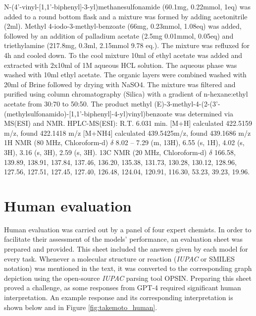 \documentclass[10pt]{article}
\begin{document}
N-(4'-vinyl-[1,1'-biphenyl]-3-yl)methanesulfonamide (60.1mg, 0.22mmol, 1eq) was added to a round bottom flask and a mixture was formed by adding acetonitrile (2ml). Methyl 4-iodo-3-methyl-benzoate (66mg, 0.23mmol, 1.08eq) was added, followed by an addition of palladium acetate (2.5mg 0.01mmol, 0.05eq) and triethylamine (217.8mg, 0.3ml, 2.15mmol 9.78 eq.). The mixture was refluxed for 4h and cooled down.  To the cool mixture 10ml of ethyl acetate was added and extracted with 2x10ml of 1M aqueous HCL solution. The aqueous phase was washed with 10ml ethyl acetate. The organic layers were combined washed with 20ml of Brine followed by drying with NaSO4. The mixture was filtered and purified using column chromatography (Silica) with a gradient of n-hexane:ethyl acetate  from 30:70 to 50:50. The product methyl (E)-3-methyl-4-(2-(3'-(methylsulfonamido)-[1,1'-biphenyl]-4-yl)vinyl)benzoate was determined via MS(ESI) and NMR.
HPLC-MS(ESI): R.T. 6.031 min. [M+H] calculated 422.5159 m/z, found 422.1418 m/z
[M+NH4] calculated 439.5425m/z, found 439.1686 m/z
1H NMR (80 MHz, Chloroform-d) $\delta$ 8.02 – 7.29 (m, 13H), 6.55 (s, 1H), 4.02 (s, 3H), 3.16 (s, 3H), 2.59 (s, 3H).
13C NMR (20 MHz, Chloroform-d) $\delta$ 166.58, 139.89, 138.91, 137.84, 137.46, 136.20, 135.38, 131.73, 130.28, 130.12, 128.96, 127.56, 127.51, 127.45, 127.40, 126.48, 124.04, 120.91, 116.30, 53.23, 39.23, 19.96.

\section{Human evaluation}
\label{ap:human_eval}

Human evaluation was carried out by a panel of four expert chemists. In order to facilitate their assessment of the models' performance, an evaluation sheet was prepared and provided. This sheet included the answers given by each model for every task. Whenever a molecular structure or reaction (\textit{IUPAC} or SMILES notation) was mentioned in the text, it was converted to the corresponding graph depiction using the open-source \textit{IUPAC} parsing tool OPSIN\cite{opsin}.
Preparing this sheet proved a challenge, as some responses from GPT-4 required significant human interpretation. An example response and its corresponding interpretation is shown below and in Figure \ref{fig:takemoto_human}.
\end{document}
